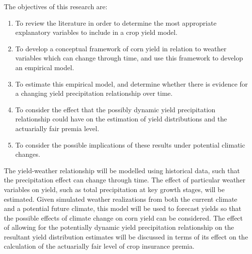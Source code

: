 The objectives of this research are:

\begin{enumerate}
 \item To review the literature in order to determine the most appropriate explanatory variables to include in a crop yield model.
  \item To develop a conceptual framework of corn yield in relation to weather variables which can change through time, and use this framework to develop an empirical model.
  \item To estimate this empirical model, and determine whether there is evidence for a changing yield precipitation relationship over time.
  \item To consider the effect that the possibly dynamic yield precipitation relationship could have on the estimation of yield distributions and the actuarially fair premia level.
  \item To consider the possible implications of these results under potential climatic changes.

\end{enumerate}
 
The yield-weather relationship will be modelled using historical data, such that the precipitation effect can change through time. The effect of particular weather variables on yield, such as total precipitation at key growth stages, will be estimated. Given simulated weather realizations from both the current climate and a potential future climate, this model will be used to forecast yields so that the possible effects of climate change on corn yield can be considered. The effect of allowing for the potentially dynamic yield precipitation relationship on the resultant yield distribution estimates will be discussed in terms of its effect on the calculation of the actuarially fair level of crop insurance premia. 

